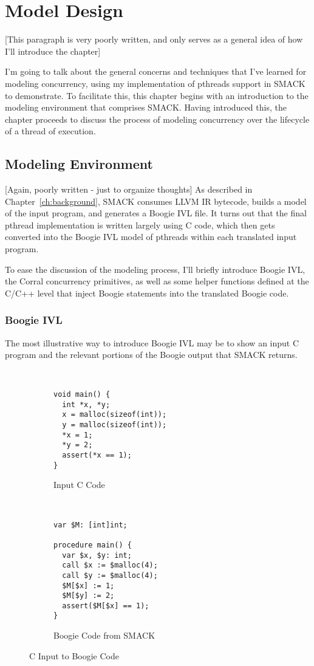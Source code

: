 \chapter{Model Design}\label{ch:modeldesign}
[This paragraph is very poorly written, and only serves as a general idea of how I'll introduce the chapter]

I'm going to talk about the general concerns and techniques that I've learned for modeling concurrency, using my implementation of pthreads support in SMACK to demonstrate.  To facilitate this, this chapter begins with an introduction to the modeling environment that comprises SMACK.  Having introduced this, the chapter proceeds to discuss the process of modeling concurrency over the lifecycle of a thread of execution.

\section{Modeling Environment}
[Again, poorly written - just to organize thoughts]
As described in Chapter~\ref{ch:background}, SMACK consumes LLVM IR bytecode, builds a model of the input program, and generates a Boogie IVL file.  It turns out that the final pthread implementation is written largely using C code, which then gets converted into the Boogie IVL model of pthreads within each translated input program.

To ease the discussion of the modeling process, I'll briefly introduce Boogie IVL, the Corral concurrency primitives, as well as some helper functions defined at the C/C++ level that inject Boogie statements into the translated Boogie code.

\subsection{Boogie IVL}
The most illustrative way to introduce Boogie IVL may be to show an input C program and the relevant portions of the Boogie output that SMACK returns.
\begin{figure}[h]
\centering
\begin{subfigure}[b]{.45\textwidth}
\centering
\begin{lstlisting}


void main() {
  int *x, *y;
  x = malloc(sizeof(int));
  y = malloc(sizeof(int));
  *x = 1;
  *y = 2;
  assert(*x == 1);
}
\end{lstlisting}
\caption{Input C Code}\label{fig:cToBoogie_a}
\end{subfigure}
~
\begin{subfigure}[b]{.45\textwidth}
\centering
\begin{lstlisting}[language=boogie]
var $M: [int]int;

procedure main() {
  var $x, $y: int;
  call $x := $malloc(4);
  call $y := $malloc(4);
  $M[$x] := 1;
  $M[$y] := 2;
  assert($M[$x] == 1);
}
\end{lstlisting}
\caption{Boogie Code from SMACK}\label{fig:cToBoogie_b}
\end{subfigure}
\caption{C Input to Boogie Code}\label{fig:cToBoogie}
\end{figure}

